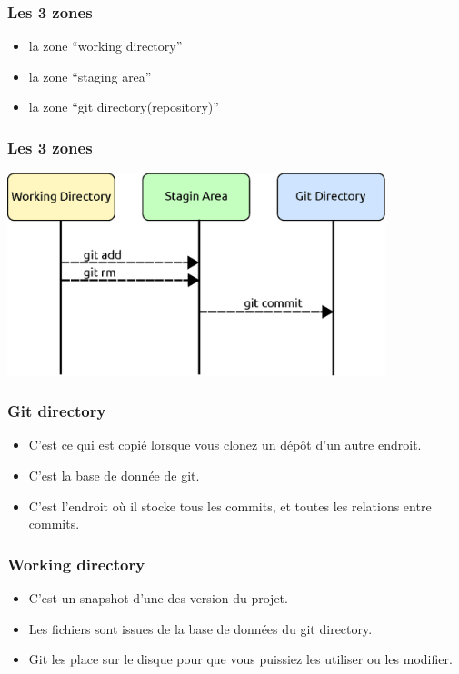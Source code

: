 \documentclass{beamer}
\begin{document}
   \begin{frame}
     \frametitle{Les 3 zones}
     \begin{itemize}
     \item la zone ``working directory''
     \item la zone ``staging area''
     \item la zone ``git directory(repository)''
     \end{itemize}
   \end{frame}

  \begin{frame}
     \frametitle{Les 3 zones}
     \begin{center}
       \includegraphics[width=11cm]{imgs/3zones.eps}
     \end{center}
  \end{frame}

  \begin{frame}
     \frametitle{Git directory}
     \begin{itemize}
     \item C'est ce qui est copié lorsque vous clonez un dépôt d'un autre endroit.
     \item C'est la base de donnée de git.
     \item C'est l'endroit où il stocke tous les commits, et toutes les relations entre commits.
     \end{itemize}
   \end{frame}

  \begin{frame}
     \frametitle{Working directory}
     \begin{itemize}
     \item C'est un snapshot d'une des version du projet.
     \item Les fichiers sont issues de la base de données du git directory.
     \item Git les place sur le disque pour que vous puissiez les utiliser ou les modifier.
     \end{itemize}
   \end{frame}
\end{document}
